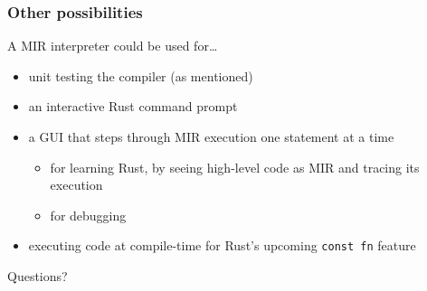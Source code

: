 \documentclass{beamer}
\begin{document}
\begin{frame}
  \frametitle{Other possibilities}

  A MIR interpreter could be used for\dots

  \begin{itemize}
    \item unit testing the compiler (as mentioned)

    \item an interactive Rust command prompt \pause

    \item a GUI that steps through MIR execution one statement at a time

      \begin{itemize}
        \item for learning Rust, by seeing high-level code as MIR and tracing
          its execution

        \item for debugging
      \end{itemize}

      \pause

    \item executing code at compile-time for Rust's upcoming
      \texttt{const fn} feature
  \end{itemize}
\end{frame}

\begin{frame}
  \begin{center}
    \LARGE{Questions?}
  \end{center}
\end{frame}
\end{document}
